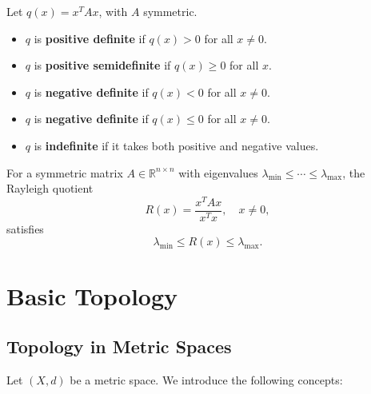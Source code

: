 \begin{definition}
Let $q(x) = x^T A x$, with $A$ symmetric.
\begin{itemize}
    \item $q$ is \textbf{positive definite} if $q(x) > 0$ for all $x \neq 0$.
    \item $q$ is \textbf{positive semidefinite} if $q(x) \geq 0$ for all $x$.
    \item $q$ is \textbf{negative definite} if $q(x) < 0$ for all $x \neq 0$.
    \item $q$ is \textbf{negative definite} if $q(x) \leq 0$ for all $x \neq 0$.
    \item $q$ is \textbf{indefinite} if it takes both positive and negative values.
\end{itemize}
\end{definition}

\begin{theorem}
For a symmetric matrix $A \in \mathbb{R}^{n \times n}$ with eigenvalues $\lambda_{\min} \leq \cdots \leq \lambda_{\max}$,  
the Rayleigh quotient
\begin{equation}
R(x) = \frac{x^T A x}{x^T x}, \quad x \neq 0,
\end{equation}
satisfies
\begin{equation}
\lambda_{\min} \leq R(x) \leq \lambda_{\max}.
\end{equation}
\end{theorem}

\section{Basic Topology}

\subsection{Topology in Metric Spaces}

Let $(X,d)$ be a metric space. We introduce the following concepts:


